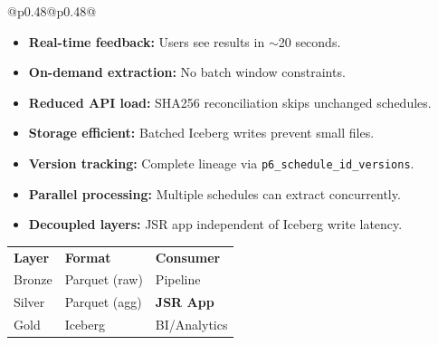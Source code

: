 \documentclass[10pt, a4paper]{article}
\begin{document}
{\begin{tabular}[t]{@{}p{}@{\hspace{0.02\textwidth}}p{}@{}}
    {\footnotesize
    \begin{itemize}[leftmargin=1em, itemsep=0.05em]
        \item[\checkmark] \textbf{Real-time feedback:} Users see results in $\sim$20 seconds.
        \item[\checkmark] \textbf{On-demand extraction:} No batch window constraints.
        \item[\checkmark] \textbf{Reduced API load:} SHA256 reconciliation skips unchanged schedules.
        \item[\checkmark] \textbf{Storage efficient:} Batched Iceberg writes prevent small files.
        \item[\checkmark] \textbf{Version tracking:} Complete lineage via \texttt{p6\_schedule\_id\_versions}.
        \item[\checkmark] \textbf{Parallel processing:} Multiple schedules can extract concurrently.
        \item[\checkmark] \textbf{Decoupled layers:} JSR app independent of Iceberg write latency.
    \end{itemize}
    }

    \vspace{0.2em}

    \begin{tikzpicture}
        \node[fill=black!80, text=white, rounded corners=3pt, inner sep=2pt, text width=\linewidth-6pt, align=left] {\textbf{Data Layering Strategy}};
    \end{tikzpicture}

    \vspace{0.05em}

    {\footnotesize
    \renewcommand{\arraystretch}{1.1}
    \begin{tabularx}{\linewidth}{@{}lXl@{}}
    \rowcolor{black!10}
    \textbf{Layer} & \textbf{Format} & \textbf{Consumer} \\
    \rowcolor{white}
    Bronze & Parquet (raw) & Pipeline \\
    \rowcolor{black!5}
    Silver & Parquet (agg) & \textbf{JSR App} \\
    \rowcolor{white}
    Gold & Iceberg & BI/Analytics \\
    \end{tabularx}
    \renewcommand{\arraystretch}{1.0}
    }

\end{tabular}
}

\vspace{0.3em}
\end{document}
